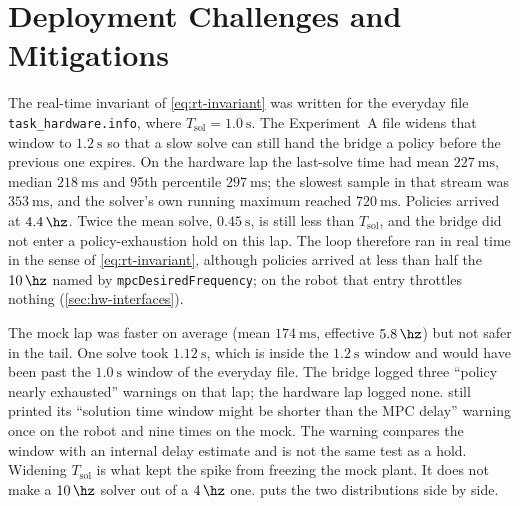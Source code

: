 \section{Deployment Challenges and Mitigations}
\label{sec:hw-challenges}

The real-time invariant of \cref{eq:rt-invariant} was written for the
everyday file \texttt{task\_hardware.info}, where
$T_{\mathrm{sol}}=\qty{1.0}{\second}$. The Experiment~A file widens that
window to $\qty{1.2}{\second}$ so that a slow solve can still hand the
bridge a policy before the
previous one expires. On the hardware lap the last-solve time had mean
$\qty{227}{\milli\second}$, median $\qty{218}{\milli\second}$ and 95th
percentile $\qty{297}{\milli\second}$; the slowest sample in that stream
was $\qty{353}{\milli\second}$, and the solver's own running maximum
reached $\qty{720}{\milli\second}$. Policies arrived at
$\qty{4.4}{\hz}$. Twice the mean solve, $\qty{0.45}{\second}$, is still
less than $T_{\mathrm{sol}}$, and the bridge did not enter a
policy-exhaustion hold on this lap. The loop therefore ran in real time
in the sense of \cref{eq:rt-invariant}, although policies arrived at
less than half the $\qty{10}{\hz}$ named by \texttt{mpcDesiredFrequency};
on the robot that entry throttles nothing (\cref{sec:hw-interfaces}).

The mock lap was faster on average (mean $\qty{174}{\milli\second}$,
effective $\qty{5.8}{\hz}$) but not safer in the tail. One solve took
$\qty{1.12}{\second}$, which is inside the $\qty{1.2}{\second}$ window
and would have been past the $\qty{1.0}{\second}$ window of the everyday
file. The bridge logged three ``policy nearly exhausted'' warnings on
that lap; the hardware lap logged none. \ocs{} still printed its
``solution time window might be shorter than the MPC delay'' warning
once on the robot and nine times on the mock. The warning compares the
window with an internal delay estimate and is not the same test as a
hold. Widening $T_{\mathrm{sol}}$ is what kept the spike from freezing
the mock plant. It does not make a $\qty{10}{\hz}$ solver out of a
$\qty{4}{\hz}$ one.  puts the two distributions
side by side.

